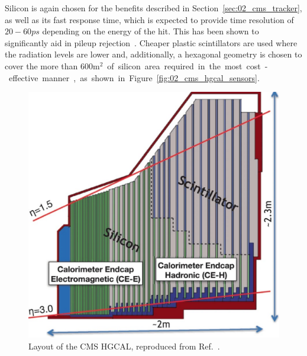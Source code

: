 Silicon is again chosen for the benefits described in Section~\ref{sec:02_cms_tracker}, as well as its fast response time, which is expected to provide time resolution of $20-60\unit{ps}$ depending on the energy of the hit.
This has been shown to significantly aid in pileup rejection~\cite{CMSHGCAL:2023rsx}.
Cheaper plastic scintillators are used where the radiation levels are lower and, additionally, a hexagonal geometry is chosen to cover the more than 600\unit{m$^2$} of silicon area required in the most cost-effective manner, as shown in Figure~\ref{fig:02_cms_hgcal_sensors}.

\begin{figure}[ht]
    \centering
    \includegraphics[width=\textwidth]{figures/02-CMS/cms/phase2/hgcal_layout}
    \caption{Layout of the CMS HGCAL, reproduced from Ref.~\cite{Quast2021}.}
    \label{fig:02_cms_hgcal}
\end{figure}

